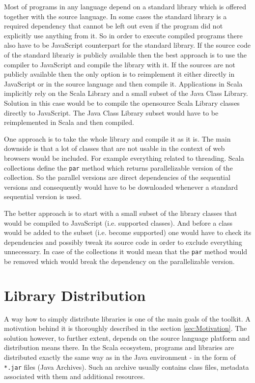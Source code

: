 \documentclass[12pt,a4paper]{report}
\begin{document}
Most of programs in any language depend on a standard library which is offered together with the source language. In some cases the standard library is a required dependency that cannot be left out even if the program did not explicitly use anything from it. So in order to execute compiled programs there also have to be JavaScript counterpart for the standard library. If the source code of the standard librariy is publicly available then the best approach is to use the compiler to JavaScript and compile the library with it. If the sources are not publicly available then the only option is to reimplement it either directly in JavaScript or in the source language and then compile it. Applications in Scala implicitly rely on the Scala Library \cite{ScalaLibrary} and a small subset of the Java Class Library. Solution in this case would be to compile the opensource Scala Library classes directly to JavaScript. The Java Class Library subset would have to be reimplemented in Scala and then compiled.

One approach is to take the whole library and compile it as it is. The main downside is that a lot of classes that are not usable in the context of web browsers would be included. For example everything related to threading. Scala collections define the \texttt{par} method which returns parallelizable version of the collection. So the parallel versions are direct dependencies of the sequential versions and consequently would have to be downloaded whenever a standard sequential version is used.

The better approach is to start with a small subset of the library classes that would be compiled to JavaScript (i.e. supported classes). And before a class would be added to the subset (i.e. become supported) one would have to check its dependencies and possibly tweak its source code in order to exclude everything unnecessary. In case of the collections it would mean that the \texttt{par} method would be removed which would break the dependency on the parallelizable version.
 
\section{Library Distribution}

A way how to simply distribute libraries is one of the main goals of the toolkit. A motivation behind it is thoroughly described in the section \ref{sec:Motivation}. The solution however, to further extent, depends on the source language platform and distribution means there. In the Scala ecosystem, programs and libraries are distributed exactly the same way as in the Java environment - in the form of \texttt{*.jar} files (Java Archives). Such an archive usually contains class files, metadata associated with them and additional resources.
\end{document}

